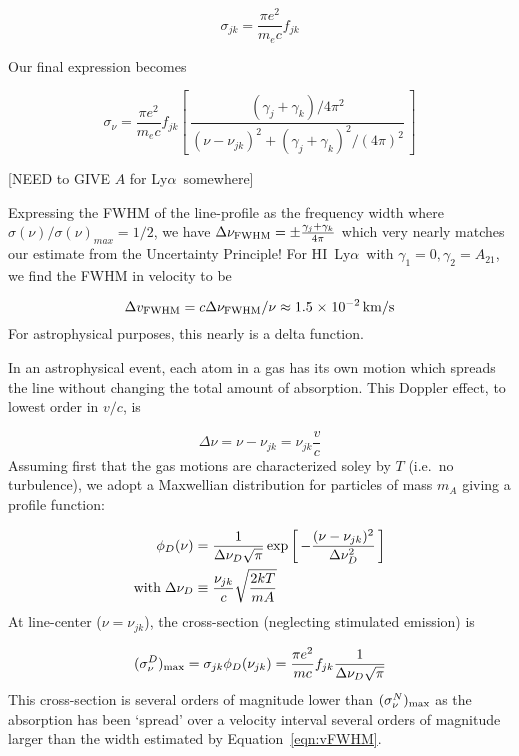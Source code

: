 \documentclass[graybox]{svmult}
\newcommand{\HI}{H{\sc I}}
\def\lya{Ly$\alpha$}
\def\ltk{\left [ \,}
\def\rtk{\, \right  ] }
\def\sci#1{{\; \times \; 10^{#1}}}
\begin{document}
\begin{equation}
\sigma_{jk} = \frac{\pi e^2}{m_e c} f_{jk}
\end{equation}

Our final expression becomes

\begin{equation}
\sigma_\nu = \frac{\pi e^2}{m_e c} f_{jk} 
\ltk \frac{(\gamma_j + \gamma_k)/4\pi^2}{(\nu - \nu_{jk})^2
+ (\gamma_j + \gamma_k)^2 / (4\pi)^2} \rtk
\end{equation}

[NEED to GIVE $A$ for \lya\ somewhere]

Expressing the FWHM of the line-profile as 
the frequency width where $\sigma(\nu)/\sigma(\nu)_{max} = 1/2$,
we have $\Delta\nu_{\rm FWHM} = \pm \frac{\gamma_j + \gamma_k}{4\pi}$
which very nearly matches our estimate from the
Uncertainty Principle!
For \HI\ \lya\ with $\gamma_1=0, \gamma_2=A_{21}$,
we find the FWHM in velocity to be 

\begin{equation}
\Delta v_{\rm FWHM} = c \Delta\nu_{\rm FWHM}/\nu
\approx 1.5\sci{-2} \, {\rm km/s}  
\label{eqn:vFWHM}
\end{equation}
For astrophysical purposes,
this nearly is a delta function.

In an astrophysical event, each 
atom in a gas has its own motion 
which spreads the line without changing the total 
amount of absorption.  
This Doppler effect, to lowest order in $v/c$, is

\begin{equation}
\Delta\nu = \nu - \nu_{jk} = \nu_{jk} \frac{v}{c}
\end{equation}
Assuming first that the gas motions are characterized
soley by $T$ (i.e.\ no turbulence),
we adopt a Maxwellian distribution for particles of mass $m_A$
giving a profile function:

\begin{align}
\phi_D(\nu) &= \frac{1}{\Delta \nu_D \sqrt{\pi}} 
\exp \ltk - \frac{(\nu - \nu_{jk})^2}{\Delta \nu_D^2} \rtk \\
{\rm with} \; \Delta \nu_D &\equiv \frac{\nu_{jk}}{c} \sqrt{\frac{2kT}{mA}}
\end{align}
At line-center ($\nu = \nu_{jk}$),
the cross-section (neglecting stimulated emission) is

\begin{equation}
(\sigma_\nu^D)_{\rm max} = \sigma_{jk} \phi_D(\nu_{jk})  
	= \frac{\pi e^2}{mc} f_{jk} \frac{1}{\Delta \nu_D \sqrt{\pi}}
\label{eqn:Dlinecenter}
\end{equation}
This cross-section is several orders of magnitude
lower than $(\sigma_\nu^N)_{\rm max}$ as the absorption has
been `spread' over a velocity interval several orders of
magnitude larger than the width estimated by Equation~\ref{eqn:vFWHM}.
\end{document}

